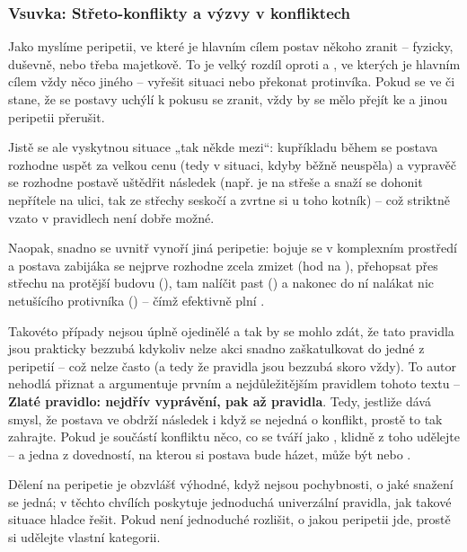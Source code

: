 \documentclass[../main.tex]{subfiles}
\begin{document}
\subsubsection{Vsuvka: Střeto-konflikty a výzvy v konfliktech}
\label{sec:hybrid}

Jako  myslíme peripetii, ve které je hlavním cílem postav někoho zranit –
fyzicky, duševně, nebo třeba majetkově. To je velký rozdíl oproti  a
, ve kterých je hlavním cílem vždy něco jiného – vyřešit situaci nebo
překonat protinvíka. Pokud se ve  či  stane, že se postavy uchýlí
k pokusu se zranit, vždy by se mělo přejít ke  a jinou peripetii přerušit.

Jistě se ale vyskytnou situace „tak někde mezi“: kupříkladu během  se postava
rozhodne uspět za velkou cenu (tedy v situaci, kdyby běžně neuspěla) a vypravěč se
rozhodne postavě uštědřit následek (např. je na střeše a snaží se dohonit nepřítele na
ulici, tak ze střechy seskočí a zvrtne si u toho kotník) – což striktně vzato v
pravidlech  není dobře možné.

Naopak, snadno se uvnitř  vynoří jiná peripetie: bojuje se v komplexním
prostředí a postava zabijáka se nejprve rozhodne zcela zmizet (hod na ),
přehopsat přes střechu na protější budovu (), tam nalíčit past
() a nakonec do ní nalákat nic netušícího protivníka () –
čímž efektivně plní .

Takovéto případy nejsou úplně ojedinělé a tak by se mohlo zdát, že tato pravidla jsou
prakticky bezzubá kdykoliv nelze akci snadno zaškatulkovat do jedné z peripetií – což
nelze často (a tedy že pravidla jsou bezzubá skoro vždy). To autor nehodlá přiznat a
argumentuje prvním a nejdůležitějším pravidlem tohoto textu – \textbf{Zlaté pravidlo:
nejdřív vyprávění, pak až pravidla}. Tedy, jestliže dává smysl, že postava ve 
obdrží následek i když se nejedná o konflikt, prostě to tak zahrajte. Pokud je součástí
konfliktu něco, co se tváří jako , klidně z toho  udělejte – a
jedna z dovedností, na kterou si postava bude házet, může být  nebo .

Dělení na peripetie je obzvlášť výhodné, když nejsou pochybnosti, o jaké snažení se
jedná; v těchto chvílích poskytuje jednoduchá univerzální pravidla, jak takové situace
hladce řešit. Pokud není jednoduché rozlišit, o jakou peripetii jde, prostě si udělejte
vlastní kategorii.
\end{document}
